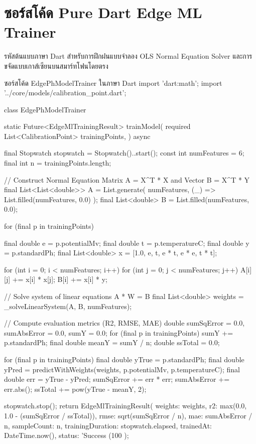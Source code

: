 \chapter{ซอร์สโค้ด Pure Dart Edge ML Trainer}
\label{app:edge_trainer}

รหัสต้นแบบภาษา Dart สำหรับการฝึกฝนแบบจำลอง OLS Normal Equation Solver และการขจัดแบบเกาส์เซียนบนสมาร์ทโฟนโดยตรง

\begin{codebox}[language=Java]{ซอร์สโค้ด EdgePhModelTrainer ในภาษา Dart}
import 'dart:math';
import '../core/models/calibration_point.dart';

class EdgePhModelTrainer {
  static Future<EdgeMlTrainingResult> trainModel({
    required List<CalibrationPoint> trainingPoints,
  }) async {
    final Stopwatch stopwatch = Stopwatch()..start();
    const int numFeatures = 6;
    final int n = trainingPoints.length;

    // Construct Normal Equation Matrix A = X^T * X and Vector B = X^T * Y
    final List<List<double>> A = List.generate(
      numFeatures, (_) => List.filled(numFeatures, 0.0)
    );
    final List<double> B = List.filled(numFeatures, 0.0);

    for (final p in trainingPoints) {
      final double e = p.potentialMv;
      final double t = p.temperatureC;
      final double y = p.standardPh;
      final List<double> x = [1.0, e, t, e * t, e * e, t * t];

      for (int i = 0; i < numFeatures; i++) {
        for (int j = 0; j < numFeatures; j++) {
          A[i][j] += x[i] * x[j];
        }
        B[i] += x[i] * y;
      }
    }

    // Solve system of linear equations A * W = B
    final List<double> weights = _solveLinearSystem(A, B, numFeatures);

    // Compute evaluation metrics (R2, RMSE, MAE)
    double sumSqError = 0.0, sumAbsError = 0.0, sumY = 0.0;
    for (final p in trainingPoints) sumY += p.standardPh;
    final double meanY = sumY / n;
    double ssTotal = 0.0;

    for (final p in trainingPoints) {
      final double yTrue = p.standardPh;
      final double yPred = predictWithWeights(weights, p.potentialMv, p.temperatureC);
      final double err = yTrue - yPred;
      sumSqError += err * err;
      sumAbsError += err.abs();
      ssTotal += pow(yTrue - meanY, 2);
    }

    stopwatch.stop();
    return EdgeMlTrainingResult(
      weights: weights,
      r2: max(0.0, 1.0 - (sumSqError / ssTotal)),
      rmse: sqrt(sumSqError / n),
      mae: sumAbsError / n,
      sampleCount: n,
      trainingDuration: stopwatch.elapsed,
      trainedAt: DateTime.now(),
      status: 'Success (100%
    );
  }
}
\end{codebox}

\clearpage
